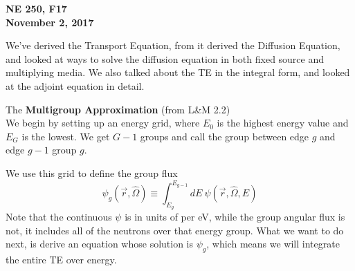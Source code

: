 \documentclass[12pt]{article}
\newcommand{\vecr}{\ensuremath{\vec{r}}}
\newcommand{\vOmega}{\ensuremath{\hat{\Omega}}}
\begin{document}
\begin{center}
{\bf NE 250, F17\\
November 2, 2017 
}
\end{center}

We've derived the Transport Equation, from it derived the Diffusion Equation, and looked at ways to solve the diffusion equation in both fixed source and multiplying media. We also talked about the TE in the integral form, and looked at the adjoint equation in detail. 

The \textbf{Multigroup Approximation} (from L\&M 2.2)\\
We begin by setting up an energy grid, where $E_0$ is the highest energy value and $E_G$ is the lowest. We get $G-1$ groups and call the group between edge $g$ and edge $g-1$ group $g$. 

\begin{center}
\end{center}

We use this grid to define the group flux
\[
\psi_g(\vecr, \vOmega) \equiv \int_{E_g}^{E_{g-1}} dE\: \psi(\vecr, \vOmega, E)
\]
Note that the continuous $\psi$ is in units of per eV, while the group angular flux is not, it includes all of the neutrons over that energy group. What we want to do next, is derive an equation whose solution is $\psi_g$, which means we will integrate the entire TE over energy. 
\end{document}

